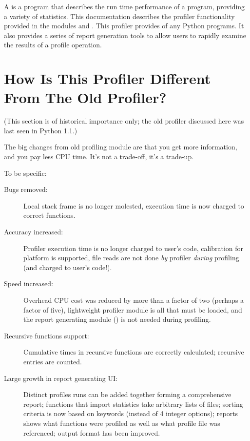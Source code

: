 A  is a program that describes the run time performance
of a program, providing a variety of statistics.  This documentation
describes the profiler functionality provided in the modules
 and .  This profiler provides
 of any Python programs.  It also
provides a series of report generation tools to allow users to rapidly
examine the results of a profile operation.


\section{How Is This Profiler Different From The Old Profiler?}

(This section is of historical importance only; the old profiler
discussed here was last seen in Python 1.1.)

The big changes from old profiling module are that you get more
information, and you pay less CPU time.  It's not a trade-off, it's a
trade-up.

To be specific:

\begin{description}

\item[Bugs removed:]
Local stack frame is no longer molested, execution time is now charged
to correct functions.

\item[Accuracy increased:]
Profiler execution time is no longer charged to user's code,
calibration for platform is supported, file reads are not done \emph{by}
profiler \emph{during} profiling (and charged to user's code!).

\item[Speed increased:]
Overhead CPU cost was reduced by more than a factor of two (perhaps a
factor of five), lightweight profiler module is all that must be
loaded, and the report generating module () is not needed
during profiling.

\item[Recursive functions support:]
Cumulative times in recursive functions are correctly calculated;
recursive entries are counted.

\item[Large growth in report generating UI:]
Distinct profiles runs can be added together forming a comprehensive
report; functions that import statistics take arbitrary lists of
files; sorting criteria is now based on keywords (instead of 4 integer
options); reports shows what functions were profiled as well as what
profile file was referenced; output format has been improved.

\end{description}


